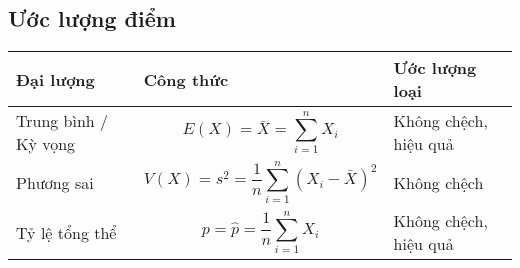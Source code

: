 \documentclass[utf8,a4paper]{article}
\begin{document}
\subsection[]{Ước lượng điểm}
\begin{center}
  \begin{tabularx}{14.35cm} {
    | >{\centering\arraybackslash} m{3cm}
    | >{\centering\arraybackslash} m{5cm}
    | >{\centering\arraybackslash} m{5cm} | }
    \hline
      Đại lượng &
      Công thức &
      Ước lượng loại \\
    \hline
      Trung bình / Kỳ vọng &
      \[E(X) = \bar{X} = \sum^{n}_{i = 1}{{X}_{i}}\] &
      Không chệch, hiệu quả \\
    \hline
      Phương sai &
      \[V(X) = {s}^{2} = \frac{1}{n} \sum^{n}_{i = 1}{{\left({X}_{i} - \bar{X}\right)}^{2}}\] &
      Không chệch \\
    \hline
      Tỷ lệ tổng thể &
      \[p = \hat{p} = \frac{1}{n} \sum^{n}_{i = 1}{{X}_{i}}\] &
      Không chệch, hiệu quả \\
    \hline
  \end{tabularx}
\end{center}
\end{document}

